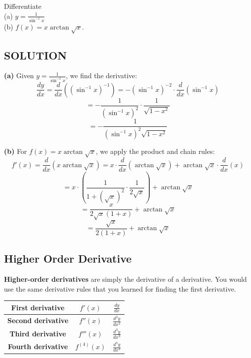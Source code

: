 \documentclass[12pt]{article}
\theoremstyle{beautifulthm}
\begin{document}
\begin{tcolorbox}[colback=examplebg, colframe=red!75!black, title=\textbf{EXAMPLE 1: Using a Tangent Line Approximation}, fonttitle=\bfseries, sharp corners]
Differentiate \\
(a) \( y = \frac{1}{\sin^{-1} x} \) \\
(b) \( f(x) = x \arctan \sqrt{x} \).

\tcblower

\subsection*{SOLUTION}
\textbf{(a)} Given \( y = \frac{1}{\sin^{-1} x} \), we find the derivative:
\[
\frac{dy}{dx} = \frac{d}{dx} \left( (\sin^{-1} x)^{-1} \right) = -(\sin^{-1} x)^{-2} \cdot \frac{d}{dx} (\sin^{-1} x)
\]
\[
= -\frac{1}{(\sin^{-1} x)^2} \cdot \frac{1}{\sqrt{1 - x^2}}
\]
\[
= -\frac{1}{(\sin^{-1} x)^2 \sqrt{1 - x^2}}
\]

\textbf{(b)} For \( f(x) = x \arctan \sqrt{x} \), we apply the product and chain rules:
\[
f'(x) = \frac{d}{dx} \left( x \arctan \sqrt{x} \right) = x \cdot \frac{d}{dx}(\arctan \sqrt{x}) + \arctan \sqrt{x} \cdot \frac{d}{dx}(x)
\]
\[
= x \cdot \left( \frac{1}{1 + (\sqrt{x})^2} \cdot \frac{1}{2\sqrt{x}} \right) + \arctan \sqrt{x}
\]
\[
= \frac{x}{2\sqrt{x}(1+x)} + \arctan \sqrt{x}
\]
\[
= \frac{\sqrt{x}}{2(1+x)} + \arctan \sqrt{x}
\]

\end{tcolorbox}


\newpage
\subsection{Higher Order Derivative}
\textbf{Higher-order derivatives} are simply the derivative of a derivative. You would use the same derivative rules that you learned for finding the first derivative.


\begin{center}
\begin{tabular}{|c|c|c|}
\hline
\textbf{First derivative} & \(f'(x)\) & \(\frac{dy}{dx}\)  \\
\hline
\textbf{Second derivative} & \(f''(x)\) & \(\frac{d^2y}{dx^2}\) \\
\hline
\textbf{Third derivative} & \(f'''(x)\) & \(\frac{d^3y}{dx^3}\)  \\
\hline
\textbf{Fourth derivative} & \(f^{(4)}(x)\) & \(\frac{d^4y}{dx^4}\) \\
\hline
\end{tabular}
\end{center}
\end{document}
